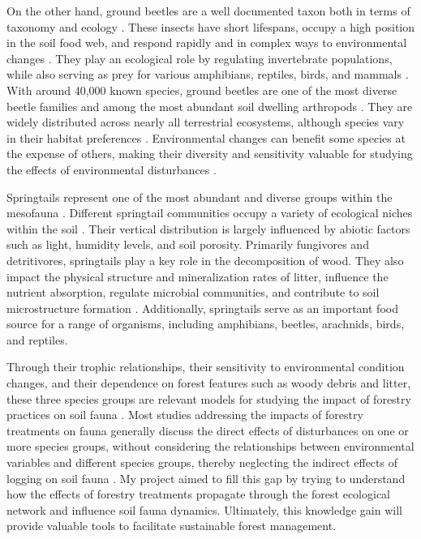 On the other hand, ground beetles are a well documented taxon both in terms of taxonomy and ecology \citep{loveiEcologyBehaviorGround1996}. 
These insects have short lifespans, occupy a high position in the soil food web, and respond rapidly and in complex ways to environmental changes \citep{loveiEcologyBehaviorGround1996}. 
They play an ecological role by regulating invertebrate populations, while also serving as prey for various amphibians, reptiles, birds, and mammals \citep{loveiEcologyBehaviorGround1996}. 
With around 40,000 known species, ground beetles are one of the most diverse beetle families and among the most abundant soil dwelling arthropods \citep{Erwin1985taxonpulse,loveiEcologyBehaviorGround1996,Rochefort2006GroundBeetle}. 
They are widely distributed across nearly all terrestrial ecosystems, although species vary in their habitat preferences  \citep{loveiEcologyBehaviorGround1996,kotzeFortyYearsCarabid2011a,Larochelle2003naturalhistory}. 
Environmental changes can benefit some species at the expense of others, making their diversity and sensitivity valuable for studying the effects of environmental disturbances \citep{Rainio2003Groundbeetles}. 

Springtails represent one of the most abundant and diverse groups within the mesofauna \citep{rusekBiodiversityCollembolaTheir1998}. 
Different springtail communities occupy a variety of ecological niches within the soil \citep{pongeVerticalDistributionCollembola2000}.
Their vertical distribution is largely influenced by abiotic factors such as light, humidity levels, and soil porosity. 
Primarily fungivores and detritivores, springtails play a key role in the decomposition of wood. 
They also impact the physical structure and mineralization rates of litter, influence the nutrient absorption, 
regulate microbial communities, and contribute to soil microstructure formation \citep{Petersen1982comparativeanalysis,Neher2012Linkinginvertebrate,Maass2015Functionalrole,Potapov2016Connectingtaxonomy}. 
Additionally, springtails serve as an important food source for a range of organisms, including amphibians, beetles, arachnids, birds, and reptiles.

Through their trophic relationships, their sensitivity to environmental condition changes, and their dependence on forest features such as woody debris and litter, 
these three species groups are relevant models for studying the impact of forestry practices on soil fauna \citep{Salmon2008Relationshipssoil}.
Most studies addressing the impacts of forestry treatments on fauna generally discuss the direct effects of disturbances on one or more species groups, 
without considering the relationships between environmental variables and different species groups, thereby neglecting the indirect effects of logging on soil fauna \citep{josephIntegratingOccupancyModels2016,Pollierer2021Diversityfunctional,Kudrin2023metaanalysiseffects}. 
My project aimed to fill this gap by trying to understand how the effects of forestry treatments propagate through the forest ecological network and influence soil fauna dynamics. 
Ultimately, this knowledge gain will provide valuable tools to facilitate sustainable forest management.

